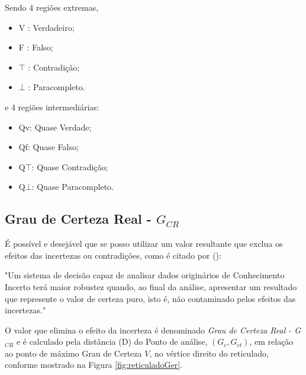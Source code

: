 Sendo 4 regiões extremas,
\begin{itemize}
\item V : Verdadeiro;
\item F : Falso;
\item $\top$ : Contradição;
\item $\bot$ : Paracompleto.
\end{itemize}
e 4 regiões intermediárias: 
\begin{itemize}
\item Qv: Quase Verdade;
\item Qf: Quase Falso;
\item Q$\top$: Quase Contradição;
\item Q$\bot$: Quase Paracompleto.

\end{itemize}



\subsection{Grau de Certeza Real - $G_{CR}$}

É possível e desejável que se posso utilizar um valor resultante que exclua os efeitos das incertezas ou contradições, 
como é citado por 
\citeauthor{JairJoaoGermano}(\citeyear{JairJoaoGermano}): 
\begin{citacao}
{
"Um sistema de decisão capaz de analisar dados originários de Conhecimento Incerto terá maior robustez quando, 
ao final da análise,
apresentar um resultado que represente o valor de certeza puro, 
isto é, não contaminado pelos efeitos das incertezas."
}
\end{citacao}

O valor que elimina o efeito da incerteza é denominado \emph{Grau de Certeza Real - G$_{CR}$} 
e é calculado pela distância (D) do Ponto de análise, $(G_c,G_{ct})$, 
em relação ao ponto de máximo Grau de Certeza $V$, 
no vértice direito do reticulado, 
conforme mostrado na Figura \ref{fig:reticuladoGer}.


